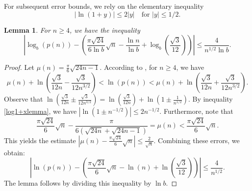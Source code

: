 \documentclass[12pt]{amsart}
\numberwithin{equation}{section}
\newtheorem{lem}[thm]{Lemma}
\begin{document}
For subsequent error bounds, we rely on the elementary inequality
\begin{equation}
\label{log1+xlemma}
|\ln(1+y)| \leq 2|y| \quad \text{for } |y| \leq 1/2.
\end{equation}

\begin{lem}
\label{logbpartitionfunc}
For $n \geq  4$, we have the inequality
\begin{equation*}
\left|\log_{b}(p(n)) - \left(\frac{\pi \sqrt{24}}{6 \ln b} \sqrt{n}-\frac{\ln n}{\ln b}+\log_{b}\left(\frac{\sqrt{3}}{12}\right) \right)\right| \leq \frac{4}{n^{1/2}\ln b}.
\end{equation*}
\end{lem}
\begin{proof}
Let $\mu(n) = \frac{\pi}{6}\sqrt{24n-1}$. According to \cite[Lemma 1]{LucaPart2}, for $n \geq 4$, we have
\begin{equation*}
\mu(n) + \ln\left(\frac{\sqrt{3}}{12n} -\frac{\sqrt{3}}{12n^{3/2}}\right) < \ln(p(n)) < \mu(n) + \ln\left(\frac{\sqrt{3}}{12n} +\frac{\sqrt{3}}{12n^{3/2}}\right).
\end{equation*}
Observe that $\ln\left(\frac{\sqrt{3}}{12n} \pm \frac{\sqrt{3}}{12n^{3/2}}\right) = \ln\left(\frac{\sqrt{3}}{12n}\right) + \ln\left(1\pm\frac{1}{n^{1/2}}\right)$. By inequality \eqref{log1+xlemma}, we have $|\ln(1\pm n^{-1/2})| \leq 2 n^{-1/2}$. Furthermore, note that 
\begin{equation*}
\frac{\pi \sqrt{24}}{6} \sqrt{n} - \frac{\pi}{6(\sqrt{24 n}+ \sqrt{24 n-1})} = \mu(n) < \frac{\pi \sqrt{24}}{6} \sqrt{n}.
\end{equation*}
This yields the estimate $\left|\mu(n) - \frac{\pi \sqrt{24}}{6} \sqrt{n}\right| \leq \frac{2}{\sqrt{n}}$. Combining these errors, we obtain:
\begin{equation*}
\left|\ln(p(n)) - \left(\frac{\pi \sqrt{24}}{6} \sqrt{n}-\ln(n)+\ln\left(\frac{\sqrt{3}}{12}\right) \right)\right| \leq \frac{4}{n^{1/2}}.
\end{equation*}
The lemma follows by dividing this inequality by $\ln b$.
\end{proof}
\end{document}
